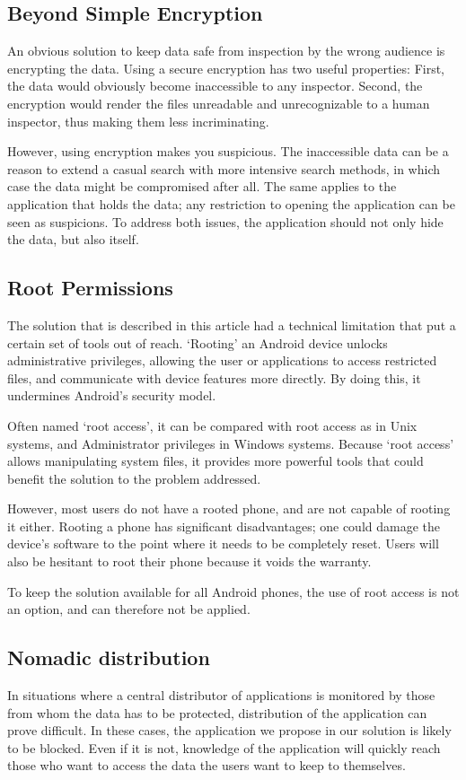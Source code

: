 \subsection{Beyond Simple Encryption}
An obvious solution to keep data safe from inspection by the wrong audience is encrypting the data.
Using a secure encryption has two useful properties:
First, the data would obviously become inaccessible to any inspector.
Second, the encryption would render the files unreadable and unrecognizable to a human inspector, thus making them less incriminating.

However, using encryption makes you suspicious.
The inaccessible data can be a reason to extend a casual search with more intensive search methods, in which case the data might be compromised after all.
The same applies to the application that holds the data; any restriction to opening the application can be seen as suspicions.
To address both issues, the application should not only hide the data, but also itself.

\subsection{Root Permissions}
The solution that is described in this article had a technical limitation that put a certain set of tools out of reach.
`Rooting' an Android device unlocks administrative privileges, allowing the user or applications to access restricted files, and communicate with device features more directly.
By doing this, it undermines Android's security model\cite{vidas2011all}.

Often named `root access', it can be compared with root access as in Unix systems, and Administrator privileges in Windows systems.
Because `root access' allows manipulating system files, it provides more powerful tools that could benefit the solution to the problem addressed.

However, most users do not have a rooted phone, and are not capable of rooting it either. 
Rooting a phone has significant disadvantages; one could damage the device's software to the point where it needs to be completely reset.
Users will also be hesitant to root their phone because it voids the warranty.

To keep the solution available for all Android phones, the use of root access is not an option, and can therefore not be applied.

\subsection{Nomadic distribution}
In situations where a central distributor of applications is monitored by those from whom the data has to be protected, distribution of the application can prove difficult.
In these cases, the application we propose in our solution is likely to be blocked.
Even if it is not, knowledge of the application will quickly reach those who want to access the data the users want to keep to themselves.

